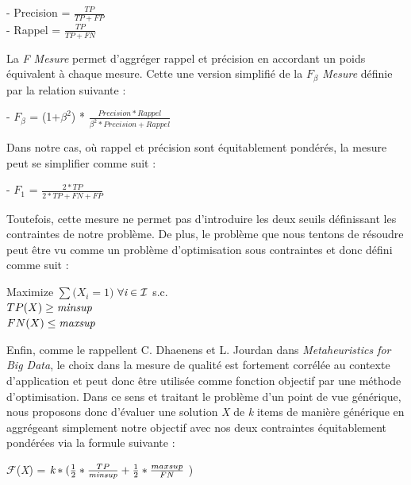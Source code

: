 \documentclass[a4paper,10pt]{report}
\begin{document}
\begin{center}
- Precision = $\frac{TP}{TP+FP}$ \\
\vspace{0.15cm}
- Rappel = $\frac{TP}{TP+FN}$\\
\end{center}

La \emph{F Mesure} permet d'aggréger rappel et précision en accordant un poids équivalent à chaque mesure. Cette une version simplifié de la \emph{$F_{\beta}$ Mesure} définie par la relation suivante : 
\begin{center}
- \emph{$F_{\beta}$} = (1+$\beta^{2}$) * $\frac{Precision*Rappel}{\beta^{2}*Precision + Rappel}$
\end{center}

Dans notre cas, où rappel et précision sont équitablement pondérés, la mesure peut se simplifier comme suit :

\begin{center}
- \emph{$F_{1}$} = $\frac{2*TP}{2*TP + FN + FP }$
\end{center}

Toutefois, cette mesure ne permet pas d'introduire les deux seuils définissant les contraintes de notre problème. De plus, le problème que nous tentons de résoudre peut être vu comme un problème d'optimisation sous contraintes et donc défini comme suit : \\

\begin{center}
	Maximize $\sum{(X_{i} = 1})$ $\forall \emph{i} \in \mathcal{I}$ s.c. \\
	$TP(X) \geq \emph{minsup}$ \\
	$FN(X) \leq \emph{maxsup}$
\end{center}

Enfin, comme le rappellent C. Dhaenens et L. Jourdan dans \emph{Metaheuristics for Big Data}, le choix dans la mesure de qualité est fortement corrélée au contexte d'application et peut donc être utilisée comme fonction objectif par une méthode d'optimisation. Dans ce sens et traitant le problème d'un point de vue générique, nous proposons donc d'évaluer une solution \emph{X} de \emph{k} items de manière générique en aggrégeant simplement notre objectif avec nos deux contraintes équitablement pondérées via la formule suivante :

\begin{center}
	$\mathcal{F}$(\emph{X}) = $\emph{k}* ( \frac{1}{2}*\frac{TP}{\emph{minsup}} + \frac{1}{2}*\frac{maxsup}{FN}$ )\\
\end{center}
\end{document}
